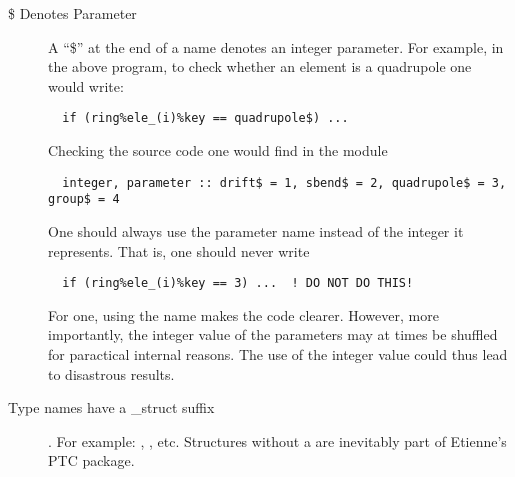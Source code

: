 \begin{description}

\item[\$ Denotes Parameter] A ``\$'' at the end of a name denotes an 
integer parameter. For example, in the above program, to check
whether an element is a quadrupole one would write:
\begin{verbatim}
  if (ring%ele_(i)%key == quadrupole$) ...
\end{verbatim}
Checking the source code one would find in the module 
\begin{verbatim}
  integer, parameter :: drift$ = 1, sbend$ = 2, quadrupole$ = 3, group$ = 4
\end{verbatim}
One should always use the parameter name instead of the integer it represents.
That is, one should never write
\begin{verbatim}
  if (ring%ele_(i)%key == 3) ...  ! DO NOT DO THIS!
\end{verbatim}
For one, using the name makes the code clearer. However, more
importantly, the integer value of the parameters may at times be
shuffled for paractical internal reasons. The use of the integer value
could thus lead to disastrous results.  

\item[ Type names have a \_struct suffix]. 
For example: , , etc. Structures without a 
 are inevitably part of Etienne's PTC package.

\end{description}
